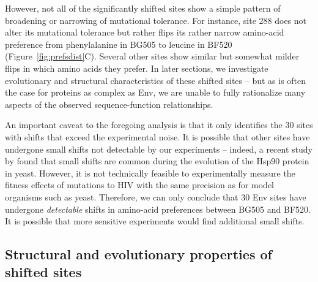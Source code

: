 \documentclass[9pt]{elife}
\begin{document}
However, not all of the significantly shifted sites show a simple pattern of broadening or narrowing of mutational tolerance.
For instance, site 288 does not alter its mutational tolerance but rather flips its rather narrow amino-acid preference from phenylalanine in BG505 to leucine in BF520 (Figure~\ref{fig:prefsdist}C).
Several other sites show similar but somewhat milder flips in which amino acids they prefer.
In later sections, we investigate evolutionary and structural characteristics of these shifted sites -- but as is often the case for proteins as complex as Env, we are unable to fully rationalize many aspects of the observed sequence-function relationships.
 
 An important caveat to the foregoing analysis is that it only identifies the 30 sites with shifts that exceed the experimental noise.
 It is possible that other sites have undergone small shifts not detectable by our experiments -- indeed, a recent study by \citet{starr2017pervasive} found that small shifts are common during the evolution of the Hsp90 protein in yeast.
 However, it is not technically feasible to experimentally measure the fitness effects of mutations to HIV with the same precision as for model organisms such as yeast.
Therefore, we can only conclude that 30 Env sites have undergone \emph{detectable} shifts in amino-acid preferences between BG505 and BF520.
It is possible that more sensitive experiments would find additional small shifts. 

\subsection{Structural and evolutionary properties of shifted sites}
\end{document}
